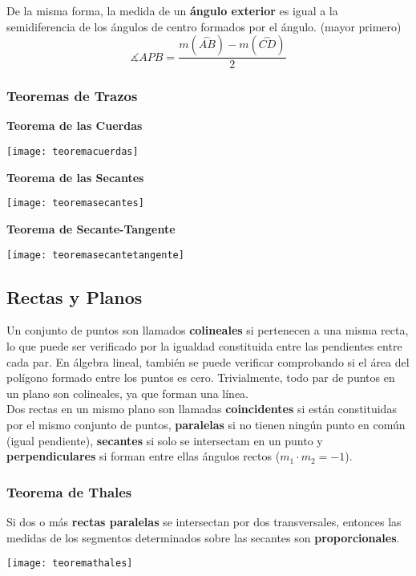 De la misma forma, la medida de un \textbf{ángulo exterior} es igual a la semidiferencia de los ángulos de centro formados por el ángulo. (mayor primero)
\begin{equation*}
    \measuredangle APB = \frac{m(\stackrel\frown{AB}) - m(\stackrel\frown{CD})}{2}
\end{equation*}

\subsubsection{Teoremas de Trazos}
\textbf{Teorema de las Cuerdas}\\

\begin{center}
\texttt{[image: teoremacuerdas]}
\end{center}
\textbf{Teorema de las Secantes}\\
\begin{center}
\texttt{[image: teoremasecantes]}
\end{center}
\textbf{Teorema de Secante-Tangente}\\
\begin{center}
\texttt{[image: teoremasecantetangente]}
\end{center}
\vfill\null\columnbreak

\subsection{Rectas y Planos}
Un conjunto de puntos son llamados \textbf{colineales} si pertenecen a una misma recta, lo que puede ser verificado por la igualdad constituida entre las pendientes entre cada par. En álgebra lineal, también se puede verificar comprobando si el área del polígono formado entre los puntos es cero. Trivialmente, todo par de puntos en un plano son colineales, ya que forman una línea.\\

Dos rectas en un mismo plano son llamadas \textbf{coincidentes} si están constituidas por el mismo conjunto de puntos, \textbf{paralelas} si no tienen ningún punto en común (igual pendiente), \textbf{secantes} si solo se intersectam en un punto y \textbf{perpendiculares} si forman entre ellas ángulos rectos ($m_1 \cdot m_2 = -1$).\\

\subsubsection{Teorema de Thales}
Si dos o más \textbf{rectas paralelas} se intersectan por dos transversales, entonces las medidas de los segmentos determinados sobre las secantes son \textbf{proporcionales}.
\begin{center}
\colorbox{white}{\texttt{[image: teoremathales]}}
\end{center}
